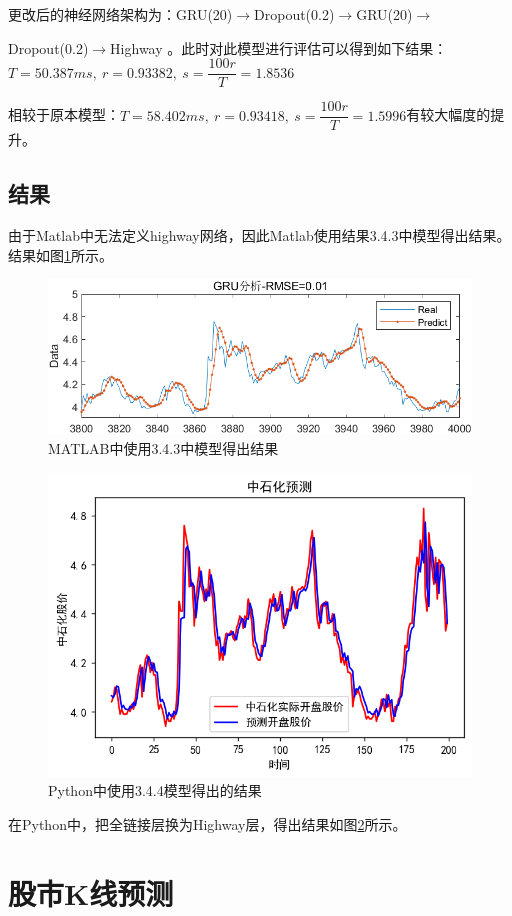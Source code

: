 \documentclass{jnuthesis}
\begin{document}
更改后的神经网络架构为：GRU(20)$ \rightarrow $Dropout(0.2)$ \rightarrow $GRU(20)$ \rightarrow $ 

\noindent Dropout(0.2)$ \rightarrow $Highway   。此时对此模型进行评估可以得到如下结果：
$  T=50.387ms, \ r=0.93382,\ s=\dfrac{100r}{T}=1.8536
 $
 
相较于原本模型：$  T=58.402ms, \ r=0.93418,\ s=\dfrac{100r}{T}=1.5996
$有较大幅度的提升。


\section{结果}


由于Matlab中无法定义highway网络，因此Matlab使用结果3.4.3中模型得出结果。结果如图\ref{fig:screenshot021}所示。
\begin{figure}[H]
	\centering
	\includegraphics[width=1\linewidth]{pic/screenshot021}
	\caption{MATLAB中使用3.4.3中模型得出结果}
	\label{fig:screenshot021}
\end{figure}


\begin{figure}[H]
	\centering
	\includegraphics[width=0.7\linewidth]{pic/screenshot022}
	\caption{Python中使用3.4.4模型得出的结果}
	\label{fig:screenshot022}
\end{figure}

在Python中，把全链接层换为Highway层，得出结果如图\ref{fig:screenshot022}所示。
\chapter{股市K线预测}
\end{document}
